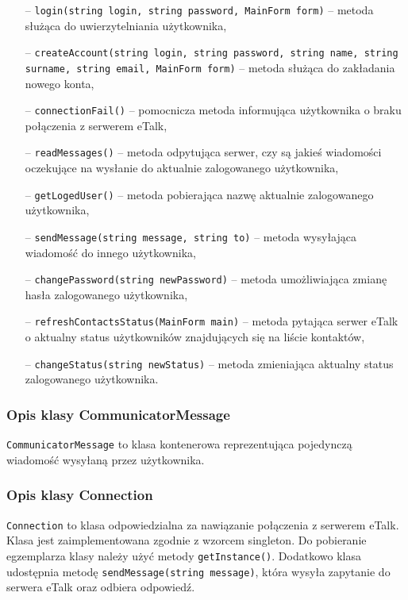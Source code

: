 \documentclass[a4paper,12pt]{article}
\begin{document}
\begin{itemize}
    \item[--] \texttt{login(string login, string password, MainForm form)} -- metoda służąca do uwierzytelniania użytkownika,
    \item[--] \texttt{createAccount(string login, string password, string name, string surname, string email, MainForm form)} -- metoda służąca do zakładania nowego konta,
    \item[--] \texttt{connectionFail()} -- pomocnicza metoda informująca użytkownika o braku połączenia z serwerem eTalk,
    \item[--] \texttt{readMessages()} -- metoda odpytująca serwer, czy są jakieś wiadomości oczekujące na wysłanie do aktualnie zalogowanego użytkownika,
    \item[--] \texttt{getLogedUser()} -- metoda pobierająca nazwę aktualnie zalogowanego użytkownika,
    \item[--] \texttt{sendMessage(string message, string to)} -- metoda wysyłająca wiadomość do innego użytkownika,
    \item[--] \texttt{changePassword(string newPassword)} -- metoda umożliwiająca zmianę hasła zalogowanego użytkownika, 
    \item[--] \texttt{refreshContactsStatus(MainForm main)} -- metoda pytająca serwer eTalk o aktualny status użytkowników znajdujących się na liście kontaktów,
    \item[--] \texttt{changeStatus(string newStatus)} -- metoda zmieniająca aktualny status zalogowanego użytkownika.
     
\end{itemize} 

\subsubsection[Opis klasy CommunicatorMessage]{Opis klasy CommunicatorMessage}
\texttt{CommunicatorMessage} to klasa kontenerowa reprezentująca pojedynczą wiadomość wysyłaną przez użytkownika. 

\subsubsection[Opis klasy Connection]{Opis klasy Connection}
\texttt{Connection} to klasa odpowiedzialna za nawiązanie połączenia z serwerem eTalk. Klasa jest zaimplementowana zgodnie z wzorcem singleton. Do pobieranie egzemplarza klasy należy użyć metody \texttt{getInstance()}. Dodatkowo klasa udostępnia metodę \texttt{sendMessage(string message)}, która wysyła zapytanie do serwera eTalk oraz odbiera odpowiedź.  
\end{document}
